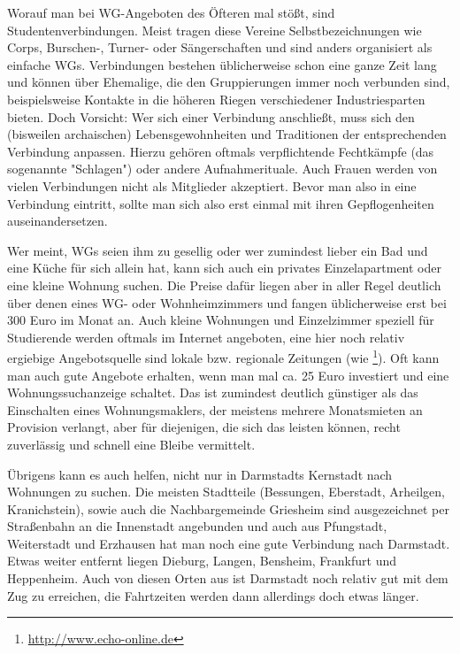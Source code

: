 {    Worauf man bei WG-Angeboten des Öfteren mal stößt, sind Studentenverbindungen. Meist tragen diese Vereine Selbstbezeichnungen wie Corps, Burschen-, Turner- oder Sängerschaften und sind anders organisiert als einfache WGs. Verbindungen bestehen üblicherweise schon eine ganze Zeit lang und können über Ehemalige, die den Gruppierungen immer noch verbunden sind, beispielsweise Kontakte in die höheren Riegen verschiedener Industriesparten bieten. Doch Vorsicht: Wer sich einer Verbindung anschließt, muss sich den (bisweilen archaischen) Lebensgewohnheiten und Traditionen der entsprechenden Verbindung anpassen. Hierzu gehören oftmals verpflichtende Fechtkämpfe (das sogenannte "Schlagen") oder andere Aufnahmerituale. Auch Frauen werden von vielen Verbindungen nicht als Mitglieder akzeptiert.
    Bevor man also in eine Verbindung eintritt, sollte man sich also erst einmal mit ihren Gepflogenheiten auseinandersetzen.

    Wer meint, WGs seien ihm zu gesellig oder wer zumindest lieber ein Bad und eine Küche für sich allein hat, kann sich auch ein privates Einzelapartment oder eine kleine Wohnung suchen. Die Preise dafür liegen aber in aller Regel deutlich über denen eines WG- oder Wohnheimzimmers und fangen üblicherweise erst bei 300 Euro im Monat an. Auch kleine Wohnungen und Einzelzimmer speziell für Studierende werden oftmals im Internet angeboten, eine hier noch relativ ergiebige Angebotsquelle sind lokale bzw. regionale Zeitungen (wie \footnote{\url{http://www.echo-online.de}}). Oft kann man auch gute Angebote erhalten, wenn man mal ca. 25 Euro investiert und eine Wohnungssuchanzeige schaltet. Das ist zumindest deutlich günstiger als das Einschalten eines Wohnungsmaklers, der meistens mehrere Monatsmieten an Provision verlangt, aber für diejenigen, die sich das leisten können, recht zuverlässig und schnell eine Bleibe vermittelt.

    Übrigens kann es auch helfen, nicht nur in Darmstadts Kernstadt nach Wohnungen zu suchen. Die meisten Stadtteile (Bessungen, Eberstadt, Arheilgen, Kranichstein), sowie auch die Nachbargemeinde Griesheim sind ausgezeichnet per Straßenbahn an die Innenstadt angebunden und auch aus Pfungstadt, Weiterstadt und Erzhausen hat man noch eine gute Verbindung nach Darmstadt. Etwas weiter entfernt liegen Dieburg, Langen, Bensheim, Frankfurt und Heppenheim. Auch von diesen Orten aus ist Darmstadt noch relativ gut mit dem Zug zu erreichen, die Fahrtzeiten werden dann allerdings doch etwas länger.
}
{}


\newpage
